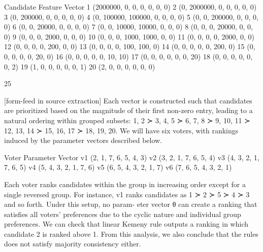 \documentclass[10pt]{article}
\begin{document}
\begin{ReviewVerbatim}
                             Candidate        Feature Vector
                                  1           (2000000, 0, 0, 0, 0, 0, 0)
                                  2           (0, 2000000, 0, 0, 0, 0, 0)
                                  3           (0, 200000, 0, 0, 0, 0, 0)
                                  4           (0, 100000, 100000, 0, 0, 0, 0)
                                  5           (0, 0, 200000, 0, 0, 0, 0)
                                  6           (0, 0, 20000, 0, 0, 0, 0)
                                  7           (0, 0, 10000, 10000, 0, 0, 0)
                                  8           (0, 0, 0, 20000, 0, 0, 0)
                                  9           (0, 0, 0, 2000, 0, 0, 0)
                                 10           (0, 0, 0, 1000, 1000, 0, 0)
                                 11           (0, 0, 0, 0, 2000, 0, 0)
                                 12           (0, 0, 0, 0, 200, 0, 0)
                                 13           (0, 0, 0, 0, 100, 100, 0)
                                 14           (0, 0, 0, 0, 0, 200, 0)
                                 15           (0, 0, 0, 0, 0, 20, 0)
                                 16           (0, 0, 0, 0, 0, 10, 10)
                                 17           (0, 0, 0, 0, 0, 0, 20)
                                 18           (0, 0, 0, 0, 0, 0, 2)
                                 19           (1, 0, 0, 0, 0, 0, 1)
                                 20           (2, 0, 0, 0, 0, 0, 0)


                                                     25

[form-feed in source extraction]
Each vector is constructed such that candidates are prioritized based on the magnitude of their
first non-zero entry, leading to a natural ordering within grouped subsets: {1, 2} ≻ {3, 4, 5} ≻
{6, 7, 8} ≻ {9, 10, 11} ≻ {12, 13, 14} ≻ {15, 16, 17} ≻ {18, 19, 20}. We will have six voters,
with rankings induced by the parameter vectors described below.

                                      Voter    Parameter Vector
                                        v1     (2, 1, 7, 6, 5, 4, 3)
                                        v2     (3, 2, 1, 7, 6, 5, 4)
                                        v3     (4, 3, 2, 1, 7, 6, 5)
                                        v4     (5, 4, 3, 2, 1, 7, 6)
                                        v5     (6, 5, 4, 3, 2, 1, 7)
                                        v6     (7, 6, 5, 4, 3, 2, 1)

Each voter ranks candidates within the group in increasing order except for a single reversed group.
For instance, v1 ranks candidates as 1 ≻ 2 ≻ 5 ≻ 4 ≻ 3 and so forth. Under this setup, no param-
eter vector θ can create a ranking that satisfies all voters’ preferences due to the cyclic nature and
individual group preferences.
We can check that linear Kemeny rule outputs a ranking in which candidate 2 is ranked above 1.
From this analysis, we also conclude that the rules does not satisfy majority consistency either.
\end{ReviewVerbatim}
\end{document}
